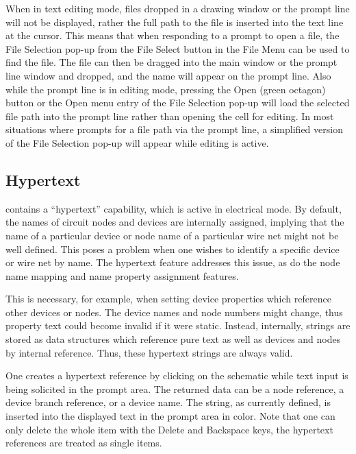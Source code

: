 When in text editing mode, files dropped in a drawing window or the
prompt line will not be displayed, rather the full path to the file is
inserted into the text line at the cursor.  This means that when
responding to a prompt to open a file, the {\cb File Selection} pop-up
from the {\cb File Select} button in the {\cb File Menu} can be used
to find the file.  The file can then be dragged into the main window
or the prompt line window and dropped, and the name will appear on the
prompt line.  Also while the prompt line is in editing mode, pressing
the {\cb Open} (green octagon) button or the {\cb Open} menu entry of
the {\cb File Selection} pop-up will load the selected file path into
the prompt line rather than opening the cell for editing.  In most
situations where {\Xic} prompts for a file path via the prompt line, a
simplified version of the {\cb File Selection} pop-up will appear
while editing is active.

\subsection{Hypertext}
\label{hypertext}

{\Xic} contains a ``hypertext'' capability, which is active in
electrical mode.  By default, the names of circuit nodes and devices
are internally assigned, implying that the name of a particular device
or node name of a particular wire net might not be well defined.  This
poses a problem when one wishes to identify a specific device or wire
net by name.  The hypertext feature addresses this issue, as do the
node name mapping and {\et name} property assignment features.
 
This is necessary, for example, when setting device properties which
reference other devices or nodes.  The device names and node numbers
might change, thus property text could become invalid if it were
static.  Instead, internally, strings are stored as data structures
which reference pure text as well as devices and nodes by internal
reference.  Thus, these hypertext strings are always valid.

One creates a hypertext reference by clicking on the schematic while
text input is being solicited in the prompt area.  The returned data
can be a node reference, a device branch reference, or a device name. 
The string, as currently defined, is inserted into the displayed text
in the prompt area in color.  Note that one can only delete the whole
item with the {\kb Delete} and {\kb Backspace} keys, the hypertext
references are treated as single items.

